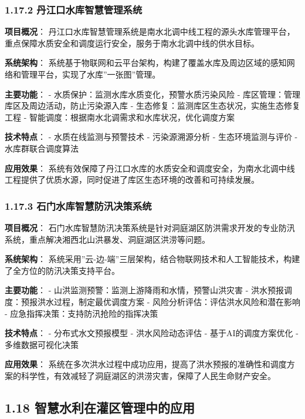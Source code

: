 \subsubsection{1.17.2
丹江口水库智慧管理系统}\label{ux4e39ux6c5fux53e3ux6c34ux5e93ux667aux6167ux7ba1ux7406ux7cfbux7edf}

\textbf{项目概况}：
丹江口水库智慧管理系统是南水北调中线工程的源头水库管理平台，重点保障水质安全和调度运行安全，服务于南水北调中线的供水目标。

\textbf{系统架构}：
系统基于物联网和云平台架构，构建了覆盖水库及周边区域的感知网络和管理平台，实现了水库''一张图''管理。

\textbf{主要功能}： - 水质保护：监测水库水质变化，预警水质污染风险 -
库区管理：管理库区及周边活动，防止污染源入库 -
生态修复：监测库区生态状况，实施生态修复工程 -
智能调度：根据南水北调需求和水库状况，优化调度方案

\textbf{技术特点}： - 水质在线监测与预警技术 - 污染源溯源分析 -
生态环境监测与评价 - 水库群联合调度算法

\textbf{应用效果}：
系统有效保障了丹江口水库的水质安全和调度安全，为南水北调中线工程提供了优质水源，同时促进了库区生态环境的改善和可持续发展。

\subsubsection{1.17.3
石门水库智慧防汛决策系统}\label{ux77f3ux95e8ux6c34ux5e93ux667aux6167ux9632ux6c5bux51b3ux7b56ux7cfbux7edf}

\textbf{项目概况}：
石门水库智慧防汛决策系统是针对洞庭湖区防洪需求开发的专业防汛系统，重点解决湘西北山洪暴发、洞庭湖区洪涝等问题。

\textbf{系统架构}：
系统采用''云-边-端''三层架构，结合物联网技术和人工智能技术，构建了全方位的防汛决策支持平台。

\textbf{主要功能}： - 山洪监测预警：监测上游降雨和水情，预警山洪灾害 -
洪水预报调度：预报洪水过程，制定最优调度方案 -
风险分析评估：评估洪水风险和潜在影响 -
应急指挥决策：支持防汛抢险的指挥决策

\textbf{技术特点}： - 分布式水文预报模型 - 洪水风险动态评估 -
基于AI的调度方案优化 - 多维数据可视化决策

\textbf{应用效果}：
系统在多次洪水过程中成功应用，提高了洪水预报的准确性和调度方案的科学性，有效减轻了洞庭湖区的洪涝灾害，保障了人民生命财产安全。

\subsection{1.18
智慧水利在灌区管理中的应用}\label{ux667aux6167ux6c34ux5229ux5728ux704cux533aux7ba1ux7406ux4e2dux7684ux5e94ux7528}

